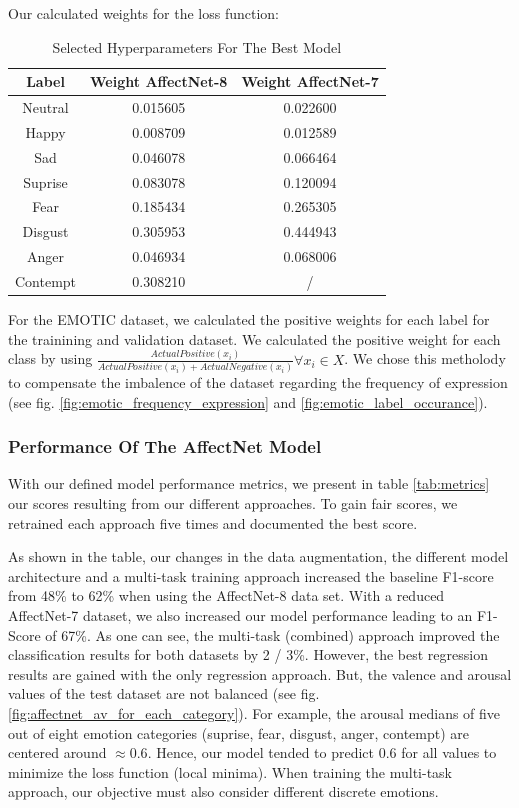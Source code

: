 \documentclass[conference]{IEEEtran}
\begin{document}
Our calculated weights for the loss function: 

\begin{table}[htbp]
\centering
\begin{tabular}{c | c | c}
 \textbf{Label} & \textbf{Weight AffectNet-8} & \textbf{Weight AffectNet-7} \\ 
  \hline
 Neutral & 0.015605 & 0.022600\\
 \hline 
 Happy & 0.008709 & 0.012589\\
 \hline
  Sad & 0.046078 & 0.066464\\
 \hline
 Suprise & 0.083078 & 0.120094\\
 \hline
 Fear & 0.185434 & 0.265305\\
 \hline
 Disgust & 0.305953 & 0.444943\\
 \hline
 Anger & 0.046934 & 0.068006\\
 \hline
 Contempt & 0.308210 & / \\
\end{tabular}
\caption{Selected Hyperparameters For The Best Model}
\label{tab:hyperparameters}
\end{table}

For the EMOTIC dataset, we calculated the positive weights for each label for the trainining and validation dataset. We calculated the positive weight for each class by using $ \frac{Actual Positive(x_i)}{Actual Positive(x_i) + Actual Negative (x_i)}\forall x_i \in X $. We chose this metholody to compensate the imbalence of the dataset regarding the frequency of expression (see fig. \ref{fig:emotic_frequency_expression} and \ref{fig:emotic_label_occurance}). \\

\subsubsection{Performance Of The AffectNet Model}
With our defined model performance metrics, we present in table \ref{tab:metrics} our scores resulting from our different approaches. To gain fair scores, we retrained each approach five times and documented the best score.

As shown in the table, our changes in the data augmentation, the different model architecture and a multi-task training approach increased the baseline F1-score from 48\% to 62\% when using the AffectNet-8 data set. With a reduced AffectNet-7 dataset, we also increased our model performance leading to an F1-Score of 67\%.  As one can see, the multi-task (combined) approach improved the classification results for both datasets by 2 / 3\%. However, the best regression results are gained with the only regression approach. But, the valence and arousal values of the test dataset are not balanced (see fig. \ref{fig:affectnet_av_for_each_category}). For example, the arousal medians of five out of eight emotion categories (suprise, fear, disgust, anger, contempt) are centered around $\approx 0.6$. Hence, our model tended to predict 0.6 for all values to minimize the loss function (local minima). When training the multi-task approach, our objective must also consider different discrete emotions. 
\end{document}
